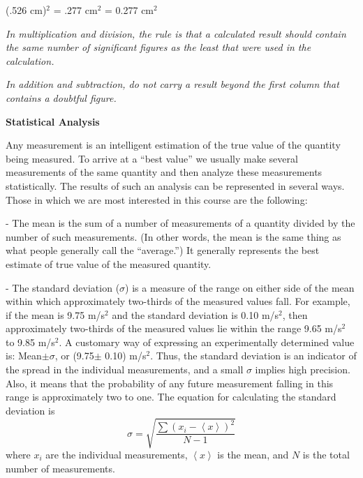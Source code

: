 {\par\centering (.526 cm)\( ^{2} \) = .277 cm\( ^{2} \)
= 0.277 cm\( ^{2} \)\par}

\textit{In multiplication and division, the rule is that a calculated result
should contain the same number of significant figures as the least that were
used in the calculation.}

\textit{In addition and subtraction, do not carry a result beyond the first
column that contains a doubtful figure.}

\textbf{Statistical Analysis} 

Any measurement is an intelligent estimation of the true value of the quantity
being measured. To arrive at a ``best value'' we usually make
several measurements of the same quantity and then analyze these measurements
statistically. The results of such an analysis can be represented in several
ways. Those in which we are most interested in this course are the following:

 - The mean is the sum of a number of measurements of a quantity
divided by the number of such measurements.
(In other words, the mean is the same thing as what people
generally call the ``average.'')
It generally represents the best estimate
of true value of the measured quantity. 

 - The standard deviation (\( \sigma  \)) is a
measure of the range on either side of the mean within which approximately two-thirds
of the measured values fall. For example, if the mean is 9.75 m/s\( ^{2} \)
and the standard deviation is 0.10 m/s\( ^{2} \), then approximately two-thirds
of the measured values lie within the range 9.65 m/s\( ^{2} \) to 9.85 m/s\( ^{2} \).
A customary way of expressing an experimentally determined value is: Mean\( \pm  \)\( \sigma  \),
or (9.75\( \pm  \) 0.10) m/s\( ^{2} \). Thus, the standard deviation is an
indicator of the spread in the individual measurements, and a small \( \sigma  \)
implies high precision. Also, it means that the probability of any future measurement
falling in this range is approximately two to one. The equation for calculating
the standard deviation is
\[
\sigma =\sqrt{\frac{\sum \left( x_{i}-\left\langle x\right\rangle \right) ^{2}}{N-1}}\]
 where \( x_{i} \) are the individual measurements, \( \left\langle x\right\rangle  \)
is the mean, and $N$ is the total number of measurements.


